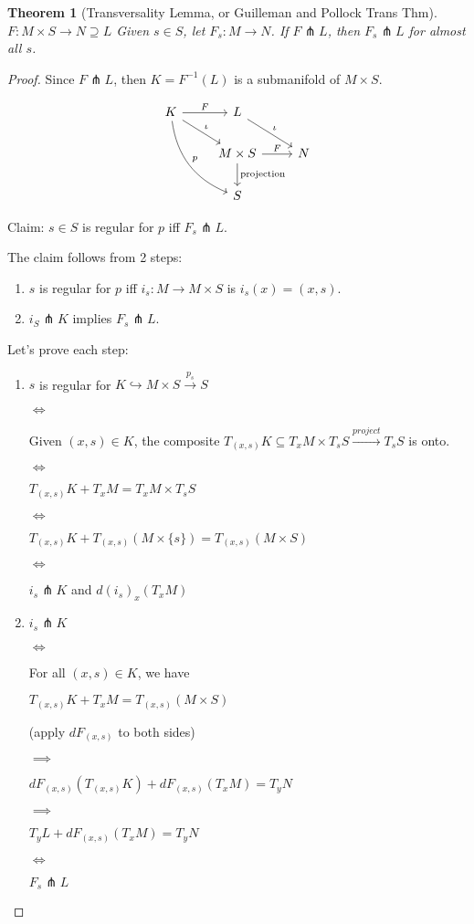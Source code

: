 \documentclass[11pt,leqno,oneside]{amsart}
\newcommand{\transverse}{\pitchfork}
\newcommand{\into}{\hookrightarrow}
\newcommand{\x}{\times}
\theoremstyle{mystyle} \newtheorem{thrm}[thm]{Theorem}
\theoremstyle{mystyle} \newtheorem{defi}[thm]{Definition}
\begin{document}
\begin{thrm}[Transversality Lemma, or Guilleman and Pollock Trans Thm]
	$F: M \x S \to N \supseteq L$
	Given $s \in S$, let $F_s: M \to N$.
	If $F \transverse L$, then $F_s \transverse L$ for almost all $s$.
\end{thrm}
\begin{proof}
	Since $F \transverse L$, then $K = F^{-1}(L)$ is a submanifold of $M \x S$.

	$$\begin{tikzcd}
		K \arrow[r, "F"] \arrow[rd, "\iota"] \arrow[rdd, "p", bend right] & L \arrow[rd, "\iota"] \\
		 & M \x S \arrow[r, "F"] \arrow[d, "\text{projection}"] & N \\
		 & S
	\end{tikzcd}$$

	Claim: $s \in S$ is regular for $p$ iff $F_s \transverse L$.

	The claim follows from 2 steps:
	\begin{enumerate}
		\item $s$ is regular for $p$ iff $i_s: M \to M \x S$ is $i_s(x) = (x,s)$.
		\item $i_S \transverse K$ implies $F_s \transverse L$.
	\end{enumerate}

	Let's prove each step:
	\begin{enumerate}
		\item
			$s$ is regular for $K \into M \x S \overset{p_s}{\to} S$

			$\iff$

			Given $(x,s) \in K$, the composite $T_{(x,s)}K \subseteq T_xM \x T_sS \overset{project}{\to} T_sS$ is onto.

			$\iff$

			$T_{(x,s)}K + T_xM = T_xM \x T_sS$

			$\iff$

			$T_{(x,s)}K + T_{(x,s)}(M \x \{s\}) = T_{(x,s)}(M \x S)$

			$\iff$

			$i_s \transverse K$ and $d(i_s)_x(T_xM)$
		\item
			$i_s \transverse K$

			$\iff$

			For all $(x,s) \in K$, we have

			$T_{(x,s)}K + T_xM = T_{(x,s)}(M \x S)$

			(apply $dF_{(x,s)}$ to both sides)

			$\implies$

			$dF_{(x,s)}(T_{(x,s)}K) + dF_{(x,s)}(T_xM) = T_yN$

			$\implies$

			$T_yL + dF_{(x,s)}(T_xM) = T_yN$

			$\iff$

			$F_s \transverse L$
	\end{enumerate}
\end{proof}
\end{document}

